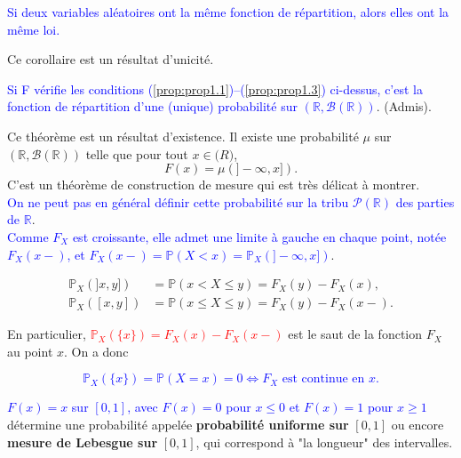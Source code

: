 \begin{corollary}
\textcolor{blue}{Si deux variables aléatoires ont la même fonction de répartition, alors
elles ont la même loi.}
\end{corollary}
Ce corollaire est un résultat d’unicité.

\theoremstyle{theorem}
\begin{theorem}
\textcolor{blue}{Si F vérifie les conditions (\ref{prop:prop1.1})–(\ref{prop:prop1.3}) ci-dessus, c’est la fonction de
répartition d’une (unique) probabilité sur $(\mathbb{R},\mathscr{B}(\mathbb{R}))$}. (Admis).
\end{theorem}
Ce théorème est un résultat d’existence. Il existe une probabilité $\mu$ sur $(\mathbb{R},\mathscr{B}(\mathbb{R}))$
telle que pour tout $x\in\mathbb(R)$, $$F(x)=\mu(]-\infty,x]).$$
C’est un théorème de construction de mesure qui est très délicat à
montrer.\\
\textcolor{blue}{On ne peut pas en général définir cette probabilité sur la tribu $\mathcal{P}(\mathbb{R})$
des parties de $\mathbb{R}$}.\\
\textcolor{blue}{Comme $F_X$ est croissante, elle admet une limite à gauche en chaque point, notée $F_X(x-)$, et
$F_X(x-)=\mathbb{P}(X<x)=\mathbb{P}_X(]-\infty,x])$}.

\begin{align}
\mathbb{P}_X(]x,y]) &= \mathbb{P}(x<X\leq y) = F_X(y)-F_X(x),\\
\mathbb{P}_X([x,y]) &= \mathbb{P}(x\leq X\leq y) = F_X(y)-F_X(x-).
\end{align}

En particulier, \textcolor{red}{ $ \mathbb{P}_X(\{x\})=F_X(x)-F_X(x-)$} est le saut de la fonction $F_X$ au point $x$. On a donc

\begin{proposition}
\textcolor{blue}{$$\mathbb{P}_X(\{x\})=\mathbb{P}(X=x)=0 \iff F_X \text{ est continue en } x.$$}
\end{proposition}

\begin{example}
\textcolor{blue}{$F(x)=x$ sur $[0,1]$, avec $F(x)=0$ pour $x\leq0$ et $F(x)=1$ pour $x\geq1$} détermine une probabilité
appelée \textbf{probabilité uniforme sur} $[0,1]$ ou encore \textbf{mesure de Lebesgue sur} $[0,1]$, qui correspond à
"la longueur" des intervalles.
\end{example}

